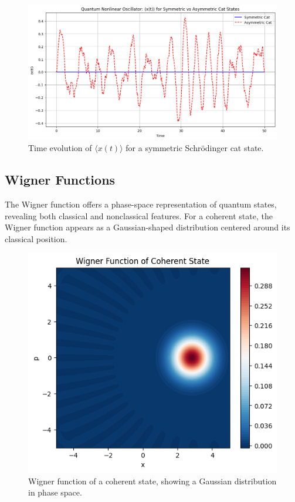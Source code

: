 \documentclass[conference]{IEEEtran}
\begin{document}
\begin{figure}[H]
    \centering
    \includegraphics[width=0.9\linewidth]{3.png}
    \caption{Time evolution of $\langle x(t) \rangle$ for a symmetric Schr\"odinger cat state.}
    \label{fig:cat_xt}
\end{figure}

\subsection{Wigner Functions}
The Wigner function offers a phase-space representation of quantum states, revealing both classical and nonclassical features. For a coherent state, the Wigner function appears as a Gaussian-shaped distribution centered around its classical position.

\begin{figure}[H]
    \centering
    \includegraphics[width=0.9\linewidth]{4.png}
    \caption{Wigner function of a coherent state, showing a Gaussian distribution in phase space.}
    \label{fig:wigner_coherent}
\end{figure}
\end{document}
